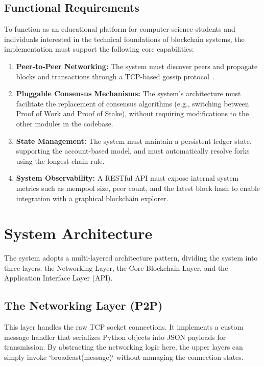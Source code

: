\subsection{Functional Requirements}

To function as an educational platform for computer science students and individuals interested in the technical foundations of blockchain systems, the implementation must support the following core capabilities:

\begin{enumerate}
    \item \textbf{Peer-to-Peer Networking:}  
    The system must discover peers and propagate blocks and transactions through a TCP-based gossip protocol~\cite{coulouris2011distributed}.

    \item \textbf{Pluggable Consensus Mechanisms:}  
    The system's architecture must facilitate the replacement of consensus algorithms (e.g., switching between Proof of Work and Proof of Stake), without requiring modifications to the other modules in the codebase.

    \item \textbf{State Management:}  
    The system must maintain a persistent ledger state, supporting the account-based model, and must automatically resolve forks using the longest-chain rule.

    \item \textbf{System Observability:}  
    A RESTful API must expose internal system metrics such as mempool size, peer count, and the latest block hash to enable integration with a graphical blockchain explorer.
\end{enumerate}


\section{System Architecture} \label{ch3_architecture}

The system adopts a multi-layered architecture pattern, dividing the system into three layers: the Networking Layer, the Core Blockchain Layer, and the Application Interface Layer (API).

\subsection{The Networking Layer (P2P)}
This layer handles the raw TCP socket connections. It implements a custom message handler that serializes Python objects into JSON payloads for transmission. By abstracting the networking logic here, the upper layers can simply invoke `broadcast(message)` without managing the connection states.

